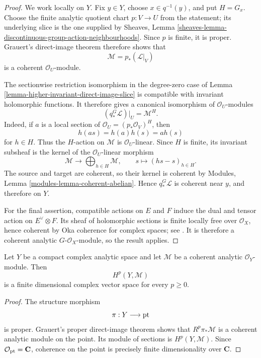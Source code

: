\begin{proof}
We work locally on $Y$. Fix $y\in Y$, choose $x\in q^{-1}(y)$, and put
$H=G_x$. Choose the finite analytic quotient chart $p:V\to U$ from the
statement; its underlying slice is the one supplied by Sheaves, Lemma
\ref{sheaves-lemma-discontinuous-group-action-neighbourhoods}. Since $p$ is
finite, it is proper. Grauert's direct-image theorem therefore shows that
$$
\mathcal M=p_*(\mathcal L|_V)
$$
is a coherent $\mathcal O_U$-module.

The sectionwise restriction isomorphism in the degree-zero case of Lemma
\ref{lemma-higher-invariant-direct-image-slice} is compatible with invariant
holomorphic functions. It therefore gives a canonical isomorphism of
$\mathcal O_U$-modules
$$
(q_*^G\mathcal L)|_U=\mathcal M^H.
$$
Indeed, if $a$ is a local section of
$\mathcal O_U=(p_*\mathcal O_V)^H$, then
$$
h(as)=h(a)h(s)=a h(s)
$$
for $h\in H$. Thus the $H$-action on $\mathcal M$ is
$\mathcal O_U$-linear. Since $H$ is finite, its invariant subsheaf is the
kernel of the $\mathcal O_U$-linear morphism
$$
\mathcal M\longrightarrow\bigoplus_{h\in H}\mathcal M,
\qquad
s\longmapsto(hs-s)_{h\in H}.
$$
The source and target are coherent, so their kernel is coherent by Modules,
Lemma \ref{modules-lemma-coherent-abelian}. Hence $q_*^G\mathcal L$ is
coherent near $y$, and therefore on $Y$.

For the final assertion, compatible actions on $E$ and $F$ induce the dual
and tensor action on $E^\vee\otimes F$. Its sheaf of holomorphic sections is
finite locally free over $\mathcal O_X$, hence coherent by Oka coherence for
complex spaces; see \cite[p. 16]{Grauert-direct-image}. It is therefore a
coherent analytic $G$-$\mathcal O_X$-module, so the result applies.
\end{proof}

\begin{lemma}
\label{lemma-compact-complex-analytic-coherent-cohomology-finite-dimensional}
\begin{reference}
\cite[Hauptsatz I, p. 57]{Grauert-direct-image}
\end{reference}
Let $Y$ be a compact complex analytic space and let $\mathcal M$ be a
coherent analytic $\mathcal O_Y$-module. Then
$$
H^p(Y,\mathcal M)
$$
is a finite dimensional complex vector space for every $p\geq 0$.
\end{lemma}

\begin{proof}
The structure morphism
$$
\pi:Y\longrightarrow \mathop{\rm pt}
$$
is proper. Grauert's proper direct-image theorem shows that
$R^p\pi_*\mathcal M$ is a coherent analytic module on the point. Its module
of sections is $H^p(Y,\mathcal M)$. Since
$\mathcal O_{\mathop{\rm pt}}=\mathbf C$, coherence on the point is precisely
finite dimensionality over $\mathbf C$.
\end{proof}

